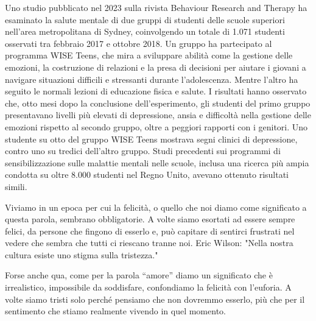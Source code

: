 \documentclass[12pt]{book} %
\begin{document}
Uno studio pubblicato nel 2023 sulla rivista Behaviour Research and Therapy ha esaminato la salute mentale di due gruppi di studenti delle scuole superiori nell’area metropolitana di Sydney, coinvolgendo un totale di 1.071 studenti osservati tra febbraio 2017 e ottobre 2018. Un gruppo ha partecipato al programma WISE Teens, che mira a sviluppare abilità come la gestione delle emozioni, la costruzione di relazioni e la presa di decisioni per aiutare i giovani a navigare situazioni difficili e stressanti durante l’adolescenza. Mentre l’altro ha seguito le normali lezioni di educazione fisica e salute. I risultati hanno osservato che, otto mesi dopo la conclusione dell’esperimento, gli studenti del primo gruppo presentavano livelli più elevati di depressione, ansia e difficoltà nella gestione delle emozioni rispetto al secondo gruppo, oltre a peggiori rapporti con i genitori. Uno studente su otto del gruppo WISE Teens mostrava segni clinici di depressione, contro uno su tredici dell’altro gruppo.
Studi precedenti sui programmi di sensibilizzazione sulle malattie mentali nelle scuole, inclusa una ricerca più ampia condotta su oltre 8.000 studenti nel Regno Unito, avevano ottenuto risultati simili.

Viviamo in un epoca per cui la felicità, o quello che noi diamo come significato a questa parola, sembrano obbligatorie.
A volte siamo esortati ad essere sempre felici, da persone che fingono di esserlo e, può capitare di sentirci frustrati nel vedere che
sembra che tutti ci riescano tranne noi. Eric Wilson: "Nella nostra cultura esiste uno stigma sulla tristezza."

Forse anche qua, come per la parola “amore” diamo un significato che è irrealistico, impossibile da soddisfare,
confondiamo la felicità con l'euforia. A volte siamo tristi solo perché pensiamo che non dovremmo esserlo, più
che per il sentimento che stiamo realmente vivendo in quel momento.
\end{document}
